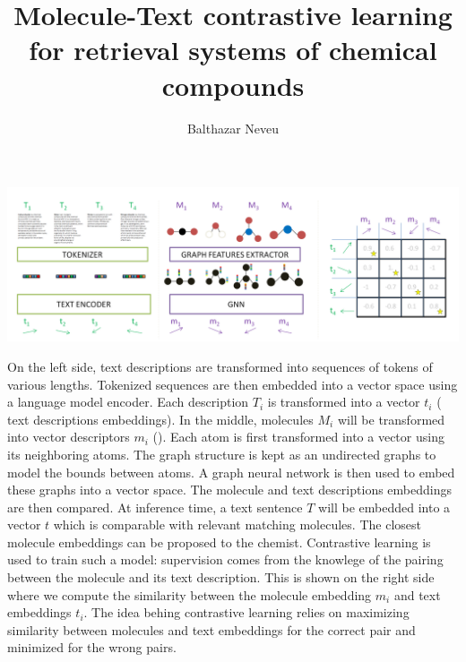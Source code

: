 \documentclass[sigconf, nonacm]{acmart}
\title{Molecule-Text contrastive learning for retrieval systems of chemical compounds}
\author{Balthazar Neveu}
\affiliation{%
  \institution{ENS Paris-Saclay}
  \city{Saclay}
  \country{France}
}
\begin{document}

  \begin{teaserfigure}
    \includegraphics[width=1.\textwidth]{figures/mol_text_overview.PNG}
    \centering
    \caption{On the left side, text descriptions are transformed into sequences of tokens of various lengths. Tokenized sequences are then embedded into a vector space using a language model encoder. Each description $T_{i}$ is transformed into a vector $t_{i}$ (\color{lime} text descriptions embeddings\color{black}). In the middle, molecules $M_{i}$ will be transformed into vector descriptors $m_{i}$ (\color{purple}{molecule embeddings}\color{black}). Each atom is first transformed into a vector using its neighboring atoms. The graph structure is kept as an undirected graphs to model the bounds between atoms. A graph neural network is then used to embed these graphs into a vector space. The molecule and text descriptions embeddings are then compared. At inference time, a text sentence $T$ will be embedded into a vector $t$ which is comparable with relevant matching molecules. The closest molecule embeddings can be proposed to the chemist. Contrastive learning is used to train such a model: supervision comes from the knowlege of the pairing between the molecule and its text description. This is shown on the right side where we compute the similarity between the molecule embedding $m_{i}$ and text embeddings $t_{i}$. The idea behing contrastive learning relies on maximizing similarity between molecules and text embeddings for the correct pair and minimized for the wrong pairs.
    }
    \label{fig:original_pipeline}
  \end{teaserfigure}
  \maketitle


  
  
  
  
  

  \newpage

  \appendix
  
  
  \newpage
  
  
\end{document}
